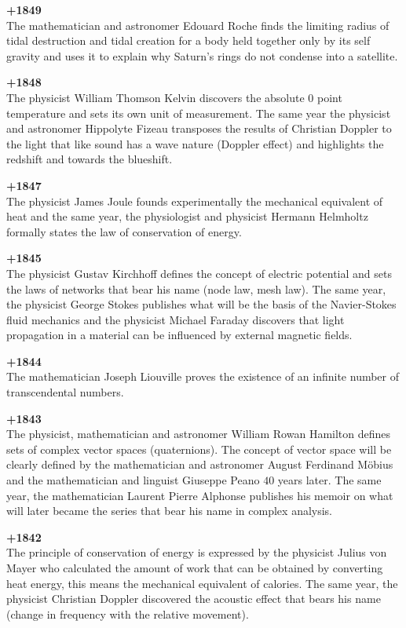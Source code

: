 \textbf{+1849}\\
The mathematician and astronomer Edouard Roche finds the limiting radius of tidal destruction and tidal creation for a body held together only by its self gravity and uses it to explain why Saturn's rings do not condense into a satellite.

\textbf{+1848}\\
The physicist William Thomson Kelvin discovers the absolute 0 point temperature and sets its own unit of measurement. The same year the physicist and astronomer Hippolyte Fizeau transposes the results of Christian Doppler to the light that like sound has a wave nature (Doppler effect) and highlights the redshift and towards the blueshift.

\textbf{+1847}\\
The physicist James Joule founds experimentally the mechanical equivalent of heat and the same year, the physiologist and physicist Hermann Helmholtz formally states the law of conservation of energy.

\textbf{+1845}\\
The physicist Gustav Kirchhoff defines the concept of electric potential and sets the laws of networks that bear his name (node law, mesh law). The same year, the physicist George Stokes publishes what will be the basis of the Navier-Stokes fluid mechanics and the physicist Michael Faraday discovers that light propagation in a material can be influenced by external magnetic fields.

\textbf{+1844}\\
The mathematician Joseph Liouville proves the existence of an infinite number of transcendental numbers.

\textbf{+1843}\\
The physicist, mathematician and astronomer William Rowan Hamilton defines sets of complex vector spaces (quaternions). The concept of vector space will be clearly defined by the mathematician and astronomer August Ferdinand Möbius and the mathematician and linguist Giuseppe Peano $40$ years later. The same year, the mathematician Laurent Pierre Alphonse publishes his memoir on what will later became the series that bear his name in complex analysis.

\textbf{+1842}\\
The principle of conservation of energy is expressed by the physicist Julius von Mayer who calculated the amount of work that can be obtained by converting heat energy, this means the mechanical equivalent of calories. The same year, the physicist Christian Doppler discovered the acoustic effect that bears his name (change in frequency with the relative movement).

